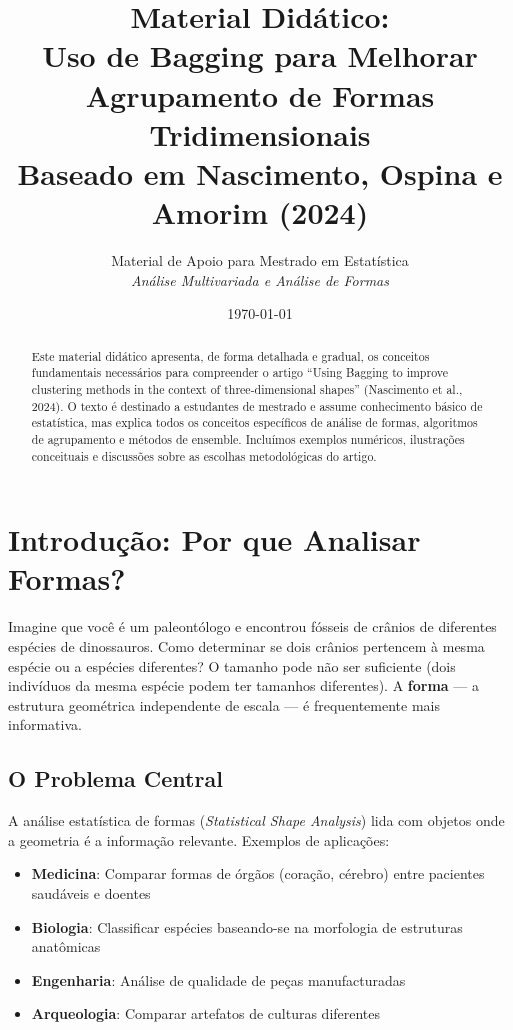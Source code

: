 \documentclass[12pt,a4paper]{article}
\title{\textbf{Material Didático:}\\[0.3cm]
\large Uso de Bagging para Melhorar Agrupamento de Formas Tridimensionais\\[0.2cm]
\normalsize Baseado em Nascimento, Ospina e Amorim (2024)}
\author{Material de Apoio para Mestrado em Estatística\\
\textit{Análise Multivariada e Análise de Formas}}
\date{\today}
\theoremstyle{definition}
\begin{document}
\maketitle

\begin{abstract}
\noindent Este material didático apresenta, de forma detalhada e gradual, os conceitos fundamentais necessários para compreender o artigo ``Using Bagging to improve clustering methods in the context of three-dimensional shapes'' (Nascimento et al., 2024). O texto é destinado a estudantes de mestrado e assume conhecimento básico de estatística, mas explica todos os conceitos específicos de análise de formas, algoritmos de agrupamento e métodos de ensemble. Incluímos exemplos numéricos, ilustrações conceituais e discussões sobre as escolhas metodológicas do artigo.
\end{abstract}

\tableofcontents
\newpage

\section{Introdução: Por que Analisar Formas?}

\begin{tcolorbox}[caixaconceito={Contexto Motivador}]
Imagine que você é um paleontólogo e encontrou fósseis de crânios de diferentes espécies de dinossauros. Como determinar se dois crânios pertencem à mesma espécie ou a espécies diferentes? O tamanho pode não ser suficiente (dois indivíduos da mesma espécie podem ter tamanhos diferentes). A \textbf{forma} --- a estrutura geométrica independente de escala --- é frequentemente mais informativa.
\end{tcolorbox}

\subsection{O Problema Central}

A análise estatística de formas (\textit{Statistical Shape Analysis}) lida com objetos onde a geometria é a informação relevante. Exemplos de aplicações:

\begin{itemize}[leftmargin=*]
    \item \textbf{Medicina}: Comparar formas de órgãos (coração, cérebro) entre pacientes saudáveis e doentes
    \item \textbf{Biologia}: Classificar espécies baseando-se na morfologia de estruturas anatômicas
    \item \textbf{Engenharia}: Análise de qualidade de peças manufacturadas
    \item \textbf{Arqueologia}: Comparar artefatos de culturas diferentes
\end{itemize}
\end{document}
